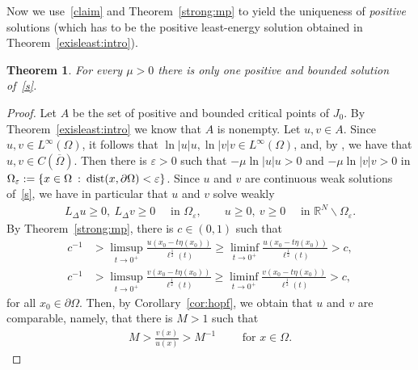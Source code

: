 \documentclass[11pt]{article}
\newcommand{\eps}{{\varepsilon}}
\newcommand{\R}{\mathbb{R}}
\numberwithin{equation}{section}
\newtheorem{theorem}{Theorem}[section]
\DeclareMathOperator{\dist}{\rm dist}
\begin{document}
Now we use~\eqref{claim} and Theorem~\ref{strong:mp} to yield the uniqueness of \emph{positive} solutions (which has to be the positive least-energy solution obtained in Theorem~\ref{exisleast:intro}).
\begin{theorem}\label{u:thm}
For every $\mu>0$ there is only one positive and bounded solution of~\eqref{s}.
\end{theorem}
\begin{proof}
Let $A$ be the set of positive and bounded critical points of $J_0$. By Theorem~\ref{exisleast:intro} we know that $A$ is nonempty. Let $u,v\in A$. Since $u,v\in L^\infty(\Omega)$, it follows that $\ln|u|u,\ln|v|v\in L^\infty(\Omega)$, and, by \cite[Theorem 1.11]{CW19}, we have that $u,v\in C(\overline{\Omega})$.  Then there is $\eps>0$ such that $-\mu\ln|u|u>0$ and $-\mu\ln|v|v>0$ in $\Omega_\eps:=\{x\in\Omega\::\: \dist(x,\partial \Omega)<\eps\}$.  Since $u$ and $v$ are continuous weak solutions of~\eqref{s}, we have in particular that $u$ and $v$ solve weakly 
\begin{align*}
    L_\Delta u\geq 0,\ L_\Delta v\geq 0\quad \text{ in }\Omega_\eps,\qquad u\geq 0,\ v\geq 0\quad \text{ in } \R^N\backslash \Omega_\eps.
\end{align*}
By Theorem~\ref{strong:mp}, there is $c\in(0,1)$ such that 
\begin{align*}
c^{-1}&>
\limsup_{t\to 0^+} \frac{u(x_0-t\eta(x_0))}{\ell^\frac{1}{2}(t)}\geq 
\liminf_{t\to 0^+} \frac{u(x_0-t\eta(x_0))}{\ell^\frac{1}{2}(t)}
>c,\\
c^{-1}&>
\limsup_{t\to 0^+} \frac{v(x_0-t\eta(x_0))}{\ell^\frac{1}{2}(t)}
\geq 
\liminf_{t\to 0^+} \frac{v(x_0-t\eta(x_0))}{\ell^\frac{1}{2}(t)}>c,
\end{align*}
 for all $x_0\in\partial \Omega.$ Then, by Corollary~\ref{cor:hopf}, we obtain that $u$ and $v$ are comparable, namely, that there is $M>1$ such that
 \begin{align}\label{comp}
     M>\frac{v(x)}{u(x)}>M^{-1}\qquad \text{ for }x\in \Omega.
 \end{align}


\end{proof}
\end{document}

